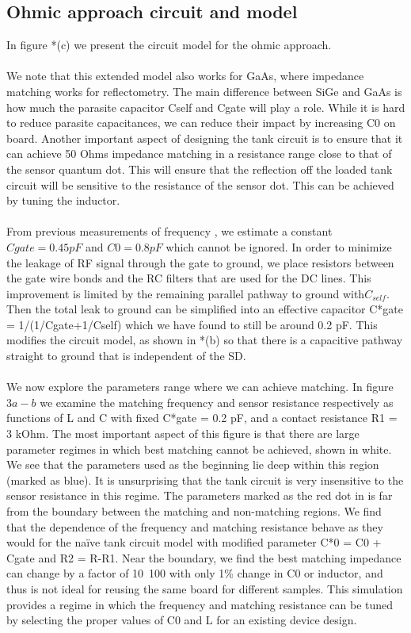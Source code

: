 \documentclass{article}
\begin{document}
\subsection{Ohmic approach circuit and model} %
	\label{sub:ohmic_approach_circuit_and_model}
	In figure *(c) we present the circuit model for the ohmic approach.   
	\\ \\
	We note that this extended model also works for GaAs, where impedance matching works for reflectometry. The main difference between SiGe and GaAs is how much the parasite capacitor Cself and Cgate will play a role. While it is hard to reduce parasite capacitances, we can reduce their impact by increasing C0 on board. Another important aspect of designing the tank circuit is to ensure that it can achieve 50 Ohms impedance matching in a resistance range close to that of the sensor quantum dot.  This will ensure that the reflection off the loaded tank circuit will be sensitive to the resistance of the sensor dot.  This can be achieved by tuning the inductor.  
	\\ \\
	From previous measurements of frequency
	, we estimate a constant $Cgate = 0.45 pF$ and $C0= 0.8 pF$ which cannot be ignored. In order to minimize the leakage of RF signal through the gate to ground, we place resistors between the gate wire bonds and the RC filters that are used for the DC lines. This improvement is limited by the remaining parallel pathway to ground with$C_{self}$. Then the total leak to ground can be simplified into an effective capacitor C*gate = 1/(1/Cgate+1/Cself) which we have found to still be around 0.2 pF. This modifies the circuit model, as shown in *(b) so that there is a capacitive pathway straight to ground that is independent of the SD.   
	\\ \\
	We now explore the parameters range where we can achieve matching. In figure $3a-b$ we examine the matching frequency and sensor resistance respectively as functions of L and C with fixed C*gate = 0.2 pF, and a contact resistance R1 = 3 kOhm.  The most important aspect of this figure is that there are large parameter regimes in which best matching cannot be achieved, shown in white.  We see that the parameters used as the beginning lie deep within this region (marked as blue). It is unsurprising that the tank circuit is very insensitive to the sensor resistance in this regime. The parameters marked as the red dot in is far from the boundary between the matching and non-matching regions. We find that the dependence of the frequency and matching resistance behave as they would for the naïve tank circuit model with modified parameter C*0 = C0 + Cgate and R2 = R-R1. Near the boundary, we find the best matching impedance can change by a factor of 10~100 with only 1\% change in C0 or inductor, and thus is not ideal for reusing the same board for different samples. This simulation provides a regime in which the frequency and matching resistance can be tuned by selecting the proper values of C0 and L for an existing device design.   
\end{document}
